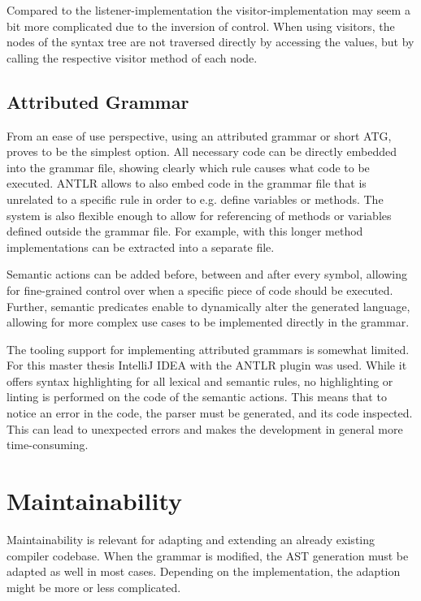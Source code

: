 Compared to the listener-implementation the visitor-implementation may seem a bit more complicated due to the inversion of control. When using visitors, the nodes of the syntax tree are not traversed directly by accessing the values, but by calling the respective visitor method of each node. 

\subsection{Attributed Grammar}

From an ease of use perspective, using an attributed grammar or short ATG, proves to be the simplest option. All necessary code can be directly embedded into the grammar file, showing clearly which rule causes what code to be executed. ANTLR allows to also embed code in the grammar file that is unrelated to a specific rule in order to e.g. define variables or methods. The system is also flexible enough to allow for referencing of methods or variables defined outside the grammar file. For example, with this longer method implementations can be extracted into a separate file. 

Semantic actions can be added before, between and after every symbol, allowing for fine-grained control over when a specific piece of code should be executed. Further, semantic predicates enable to dynamically alter the generated language, allowing for more complex use cases to be implemented directly in the grammar. 

The tooling support for implementing attributed grammars is somewhat limited. For this master thesis IntelliJ IDEA with the ANTLR plugin was used. While it offers syntax highlighting for all lexical and semantic rules, no highlighting or linting is performed on the code of the semantic actions. This means that to notice an error in the code, the parser must be generated, and its code inspected. This can lead to unexpected errors and makes the development in general more time-consuming.

\section{Maintainability}

Maintainability is relevant for adapting and extending an already existing compiler codebase. When the grammar is modified, the AST generation must be adapted as well in most cases. Depending on the implementation, the adaption might be more or less complicated. 

